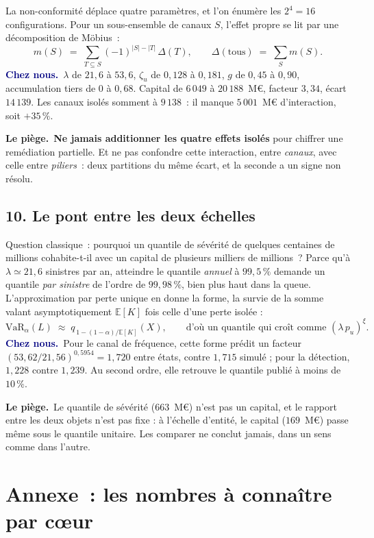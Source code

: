 \documentclass[11pt,a4paper]{article}
\newcommand{\cheznous}[1]{\smallskip\noindent\textcolor{navy}{\textbf{Chez nous.}}\ #1\par}
\newcommand{\lepiege}[1]{\smallskip\noindent\textcolor{accent}{\textbf{Le piège.}}\ #1\par}
\begin{document}
La non-conformité déplace quatre paramètres, et l'on énumère les $2^4=16$ configurations. Pour un
sous-ensemble de canaux $S$, l'effet propre se lit par une décomposition de Möbius~:
\[
m(S) \;=\; \sum_{T\subseteq S} (-1)^{|S|-|T|}\,\Delta(T),
\qquad
\Delta(\text{tous}) \;=\; \sum_{S} m(S) .
\]
\cheznous{$\lambda$ de $21{,}6$ à $53{,}6$, $\zeta_u$ de $0{,}128$ à $0{,}181$, $g$ de $0{,}45$ à
$0{,}90$, accumulation tiers de $0$ à $0{,}68$. Capital de $6\,049$ à $20\,188$~M\euro, facteur
$3{,}34$, écart $14\,139$. Les canaux isolés somment à $9\,138$~: il manque $5\,001$~M\euro{}
d'interaction, soit $+35\,\%$.}
\lepiege{\textbf{Ne jamais additionner les quatre effets isolés} pour chiffrer une remédiation
partielle. Et ne pas confondre cette interaction, entre \emph{canaux}, avec celle entre
\emph{piliers}~: deux partitions du même écart, et la seconde a un signe non résolu.}

\subsection*{10. Le pont entre les deux échelles}

Question classique~: pourquoi un quantile de sévérité de quelques centaines de millions
cohabite-t-il avec un capital de plusieurs milliers de millions~? Parce qu'à $\lambda\simeq21{,}6$
sinistres par an, atteindre le quantile \emph{annuel} à $99{,}5\,\%$ demande un quantile \emph{par
sinistre} de l'ordre de $99{,}98\,\%$, bien plus haut dans la queue. L'approximation par perte
unique en donne la forme, la survie de la somme valant asymptotiquement $\mathbb E[K]$ fois celle
d'une perte isolée :
\[
\mathrm{VaR}_\alpha(L)\;\approx\;q_{\,1-(1-\alpha)/\mathbb E[K]}(X),
\qquad\text{d'où un quantile qui croît comme } (\lambda\,p_u)^{\xi}.
\]
\cheznous{Pour le canal de fréquence, cette forme prédit un facteur
$(53{,}62/21{,}56)^{0{,}5954}=1{,}720$ entre états, contre $1{,}715$ simulé ; pour la détection,
$1{,}228$ contre $1{,}239$. Au second ordre, elle retrouve le quantile publié à moins de $10\,\%$.}
\lepiege{Le quantile de sévérité ($663$~M\euro) n'est pas un capital, et le rapport entre les deux
objets n'est pas fixe : à l'échelle d'entité, le capital ($169$~M\euro) passe même sous le quantile
unitaire. Les comparer ne conclut jamais, dans un sens comme dans l'autre.}

\newpage
\section*{Annexe~: les nombres à connaître par c\oe ur}
\end{document}
